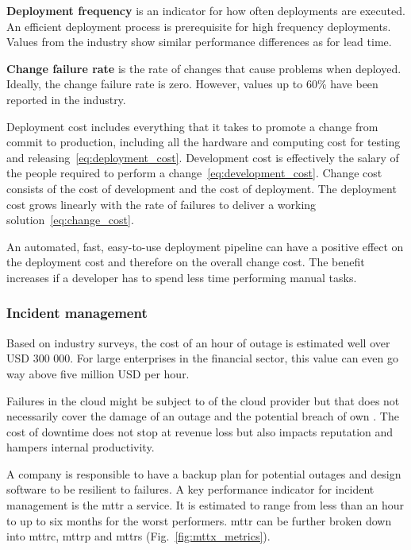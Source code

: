 \documentclass[../main.tex]{subfiles}
\begin{document}
    \textbf{Deployment frequency}
    is an indicator for how often deployments are executed.
    An efficient deployment process is prerequisite for high frequency deployments.
    Values from the industry show similar performance differences as for lead time.\cite{four_key_metrics,state_of_devops_19}

    \textbf{Change failure rate}
    is the rate of changes that cause problems when deployed.
    Ideally, the change failure rate is zero.
    However, values up to 60\% have been reported in the industry.\cite{four_key_metrics,state_of_devops_19}

    Deployment cost includes everything that it takes to promote a change from commit to production, including all the hardware and computing cost for testing and releasing~\eqref{eq:deployment_cost}.
    Development cost is effectively the salary of the people required to perform a change~\eqref{eq:development_cost}.
    Change cost consists of the cost of development and the cost of deployment.
    The deployment cost grows linearly with the rate of failures to deliver a working solution~\eqref{eq:change_cost}.

    

    An automated, fast, easy-to-use deployment pipeline can have a positive effect on the deployment cost and therefore on the overall change cost.
    The benefit increases if a developer has to spend less time performing manual tasks.

    \subsubsection{Incident management}

    Based on industry surveys, the cost of an hour of outage is estimated well over USD 300 000.
    For large enterprises in the financial sector, this value can even go way above five million USD per hour.\cite{gartner_outage_cost,itic_outage_cost}

    Failures in the \gls{cloud} might be subject to  of the \gls{cloud} provider but that does not necessarily cover the damage of an outage and the potential breach of own .
    The cost of downtime does not stop at revenue loss but also impacts reputation and hampers internal productivity.\cite{atlassian_cost_downtime}

    A company is responsible to have a backup plan for potential outages and design software to be resilient to failures.
    A key performance indicator for incident management is the \acrfull{mttr} a service.
    It is estimated to range from less than an hour to up to six months for the worst performers.
    \acrshort{mttr} can be further broken down into \acrlong{mttrc}, \acrlong{mttrp} and \acrlong{mttrs} (Fig.~\ref{fig:mttx_metrics}).\cite{state_of_devops_19}
\end{document}

